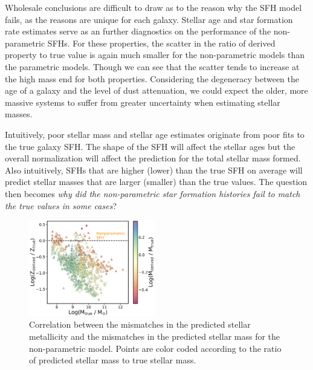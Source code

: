 \documentclass[twocolumn]{aastex62}
\begin{document}
Wholesale conclusions are difficult to draw as to the reason why the SFH model fails, as the reasons are unique for each galaxy. Stellar age and star formation rate estimates serve as an further diagnostics on the performance of the non-parametric SFHs. For these properties, the scatter in the ratio of derived property to true value is again much smaller for the non-parametric models than the parametric models. Though we can see that the scatter tends to increase at the high mass end for both properties. Considering the degeneracy between the age of a galaxy and the level of dust attenuation, we could expect the older, more massive systems to suffer from greater uncertainty when estimating stellar masses. 

Intuitively, poor stellar mass and stellar age estimates originate from poor fits to the true galaxy SFH. The shape of the SFH will affect the stellar ages but the overall normalization will affect the prediction for the total stellar mass formed. Also intuitively, SFHs that are higher (lower) than the true SFH on average will predict stellar masses that are larger (smaller) than the true values. The question then becomes \textit{why did the non-parametric star formation histories fail to match the true values in some cases}? 

\begin{figure}[h!]

\centering
\includegraphics[width=0.49\textwidth]{Zratio_dir.png}

\caption{Correlation between the mismatches in the predicted stellar metallicity and the mismatches in the predicted stellar mass for the non-parametric model. Points are color coded according to the ratio of predicted stellar mass to true stellar mass.}
\label{fig:zratio}
\end{figure}
\end{document}
